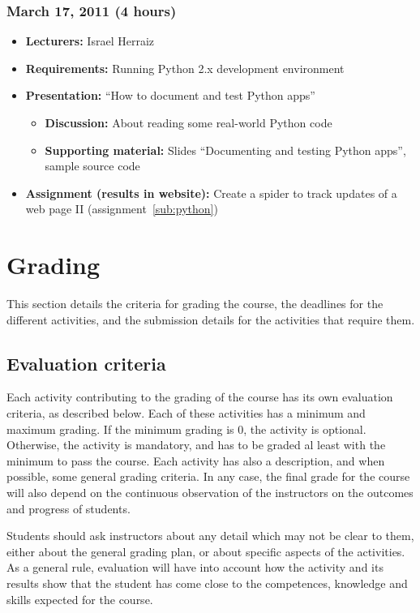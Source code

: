 \documentclass[a4paper]{article}
\begin{document}
\subsubsection{March 17, 2011 (4 hours)}

\begin{itemize}
\item \textbf{Lecturers:} Israel Herraiz
\item \textbf{Requirements:} Running Python 2.x development environment
\item \textbf{Presentation:} ``How to document and test Python apps''
  \begin{itemize}
  \item \textbf{Discussion:} About reading some real-world Python code
  \item \textbf{Supporting material:} Slides ``Documenting and testing
    Python apps'', sample source code
  \end{itemize}
\item \textbf{Assignment (results in website):} Create a spider to
  track updates of a web page II (assignment~\ref{sub:python})
\end{itemize}



\section{Grading}

This section details the criteria for grading the course, the
deadlines for the different activities, and the submission details for
the activities that require them.

\subsection{Evaluation criteria}
\label{sub:evaluation-criteria}

Each activity contributing to the grading of the course has its own
evaluation criteria, as described below. Each of these activities has
a minimum and maximum grading. If the minimum grading is 0, the
activity is optional. Otherwise, the activity is mandatory, and has to
be graded al least with the minimum to pass the course. Each activity
has also a description, and when possible, some general grading
criteria. In any case, the final grade for the course will also depend
on the continuous observation of the instructors on the outcomes and
progress of students.

Students should ask instructors about any detail which may not be
clear to them, either about the general grading plan, or about
specific aspects of the activities. As a general rule, evaluation will
have into account how the activity and its results show that the
student has come close to the competences, knowledge and skills
expected for the course.
\end{document}
